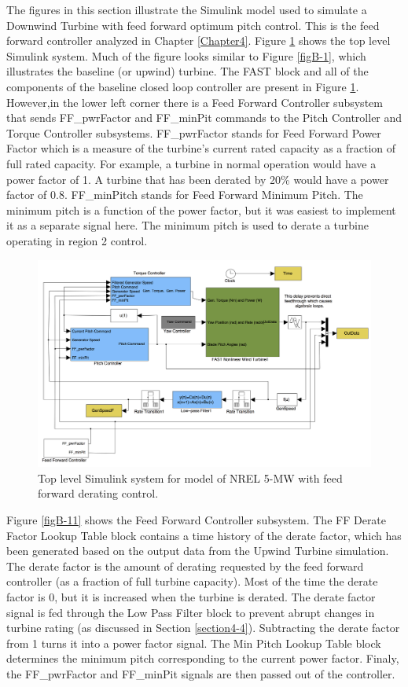 The figures in this section illustrate the Simulink model used to simulate a Downwind Turbine with feed forward optimum pitch control. This is the feed forward controller analyzed in Chapter \ref{Chapter4}. Figure \ref{figB-10} shows the top level Simulink system. Much of the figure looks similar to Figure \ref{figB-1}, which illustrates the baseline (or upwind) turbine. The FAST block and all of the components of the baseline closed loop controller are present in Figure \ref{figB-10}. However,in the lower left corner there is a Feed Forward Controller subsystem that sends FF\_pwrFactor and FF\_minPit commands to the Pitch Controller and Torque Controller subsystems. FF\_pwrFactor stands for Feed Forward Power Factor which is a measure of the turbine's current rated capacity as a fraction of full rated capacity. For example, a turbine in normal operation would have a power factor of 1. A turbine that has been derated by 20\% would have a power factor of 0.8. FF\_minPitch stands for Feed Forward Minimum Pitch. The minimum pitch is a function of the power factor, but it was easiest to implement it as a separate signal here. The minimum pitch is used to derate a turbine operating in region 2 control.

 \begin{figure}[ht]
	\centering
		\includegraphics[width=\linewidth]{Figures/AppendixBFigures/FF_Derate1.png}
		
	\caption{Top level Simulink system for model of NREL 5-MW with feed forward derating control.}
	\label{figB-10}
\end{figure}

Figure \ref{figB-11} shows the Feed Forward Controller subsystem. The FF Derate Factor Lookup Table block contains a time history of the derate factor, which has been generated based on the output data from the Upwind Turbine simulation. The derate factor is the amount of derating requested by the feed forward controller (as a fraction of full turbine capacity). Most of the time the derate factor is 0, but it is increased when the turbine is derated. The derate factor signal is fed through the Low Pass Filter block to prevent abrupt changes in turbine rating (as discussed in Section \ref{section4-4}). Subtracting the derate factor from 1 turns it into a power factor signal. The Min Pitch Lookup Table block determines the minimum pitch corresponding to the current power factor. Finaly, the FF\_pwrFactor and FF\_minPit signals are then passed out of the controller.

